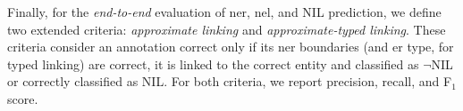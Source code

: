 

Finally, for the \textit{end-to-end} evaluation of \ac{ner}, \ac{nel}, and NIL prediction, we define two extended criteria: \textit{approximate linking} and \textit{approximate-typed linking}. These criteria consider an annotation correct only if its \ac{ner} boundaries (and \ac{er} type, for typed linking) are correct, it is linked to the correct entity and classified as $\neg$NIL or correctly classified as NIL. For both criteria, we report precision, recall, and F$_1$ score.



